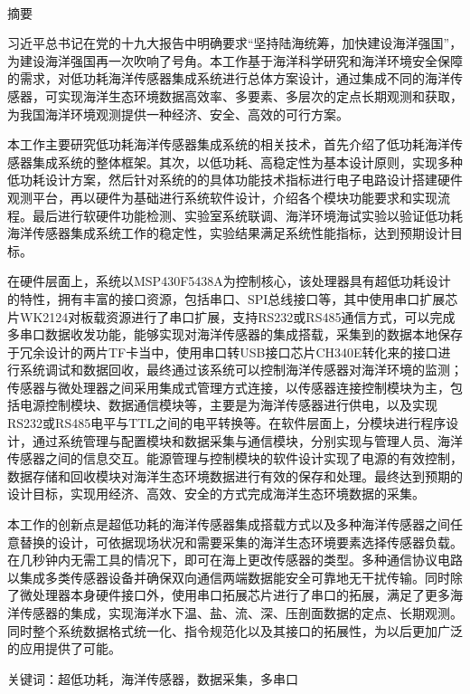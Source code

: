 \newpage

\pagestyle{plain}
\clearpage{}

\begin{center}
  {\sanhao[1.5]\heiti\oucctitle\\\vskip7pt 摘\hspace{1em}要}
\end{center}
{\normalsize\songti

习近平总书记在党的十九大报告中明确要求“坚持陆海统筹，加快建设海洋强国”，为建设海洋强国再一次吹响了号角。本工作基于海洋科学研究和海洋环境安全保障的需求，对低功耗海洋传感器集成系统进行总体方案设计，通过集成不同的海洋传感器，可实现海洋生态环境数据高效率、多要素、多层次的定点长期观测和获取，为我国海洋环境观测提供一种经济、安全、高效的可行方案。 

本工作主要研究低功耗海洋传感器集成系统的相关技术，首先介绍了低功耗海洋传感器集成系统的整体框架。其次，以低功耗、高稳定性为基本设计原则，实现多种低功耗设计方案，然后针对系统的的具体功能技术指标进行电子电路设计搭建硬件观测平台，再以硬件为基础进行系统软件设计，介绍各个模块功能要求和实现流程。最后进行软硬件功能检测、实验室系统联调、海洋环境海试实验以验证低功耗海洋传感器集成系统工作的稳定性，实验结果满足系统性能指标，达到预期设计目标。

在硬件层面上，系统以MSP430F5438A为控制核心，该处理器具有超低功耗设计的特性，拥有丰富的接口资源，包括串口、SPI总线接口等，其中使用串口扩展芯片WK2124对板载资源进行了串口扩展，支持RS232或RS485通信方式，可以完成多串口数据收发功能，能够实现对海洋传感器的集成搭载，采集到的数据本地保存于冗余设计的两片TF卡当中，使用串口转USB接口芯片CH340E转化来的接口进行系统调试和数据回收，最终通过该系统可以控制海洋传感器对海洋环境的监测；传感器与微处理器之间采用集成式管理方式连接，以传感器连接控制模块为主，包括电源控制模块、数据通信模块等，主要是为海洋传感器进行供电，以及实现RS232或RS485电平与TTL之间的电平转换等。在软件层面上，分模块进行程序设计，通过系统管理与配置模块和数据采集与通信模块，分别实现与管理人员、海洋传感器之间的信息交互。能源管理与控制模块的软件设计实现了电源的有效控制，数据存储和回收模块对海洋生态环境数据进行有效的保存和处理。最终达到预期的设计目标，实现用经济、高效、安全的方式完成海洋生态环境数据的采集。

本工作的创新点是超低功耗的海洋传感器集成搭载方式以及多种海洋传感器之间任意替换的设计，可依据现场状况和需要采集的海洋生态环境要素选择传感器负载。在几秒钟内无需工具的情况下，即可在海上更改传感器的类型。多种通信协议电路以集成多类传感器设备并确保双向通信两端数据能安全可靠地无干扰传输。同时除了微处理器本身硬件接口外，使用串口拓展芯片进行了串口的拓展，满足了更多海洋传感器的集成，实现海洋水下温、盐、流、深、压剖面数据的定点、长期观测。同时整个系统数据格式统一化、指令规范化以及其接口的拓展性，为以后更加广泛的应用提供了可能。

}
\vskip12bp
{\xiaosi\heiti\noindent
关键词：超低功耗，海洋传感器，数据采集，多串口}

